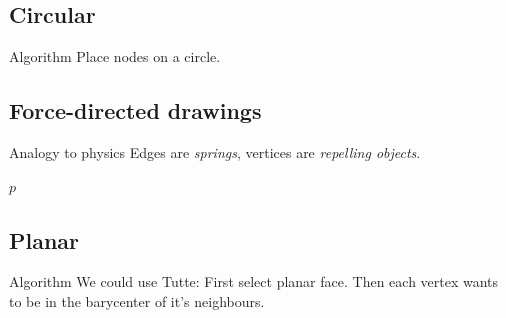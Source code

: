 \documentclass[11pt]{beamer}
\begin{document}
\subsection{Circular}
\begin{frame}{\subsecname}
    \begin{block}{Algorithm}
        Place nodes on a circle.
    \end{block}

    \pause
    \resizebox{0.8\textwidth}{!}{}
\end{frame}

\subsection{Force-directed drawings}
\begin{frame}{\subsecname}
    \begin{block}{Analogy to physics}
        \small Edges are \textit{springs}, vertices are \textit{repelling objects}.
    \end{block}
    \pause
    \begin{block}{}
        \scriptsize
        \begin{algorithmic}
                \State \Return $p$
            \EndFunction
        \end{algorithmic}
    \end{block}
\end{frame}

\subsection{Planar}
\begin{frame}{\subsecname}
    \begin{block}{Algorithm}
        We could use Tutte: First select planar face. Then each vertex wants to
        be in the barycenter of it's neighbours.
    \end{block}

    \pause
    \resizebox{0.7\textwidth}{!}{}
\end{frame}
\end{document}
